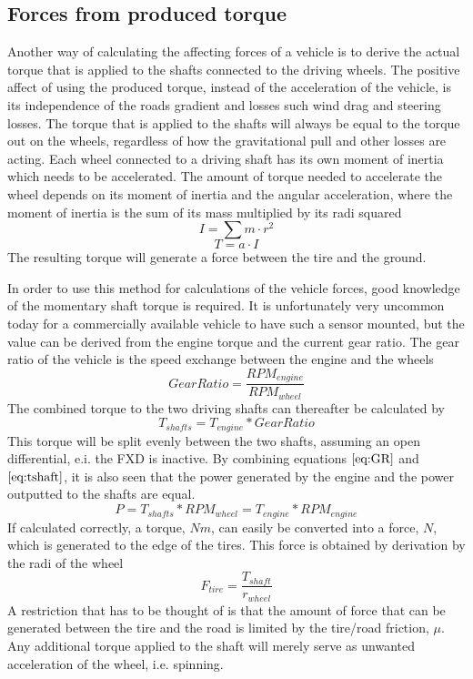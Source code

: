 \subsection{Forces from produced torque}

Another way of calculating the affecting forces of a vehicle is to derive the actual torque that is applied to the shafts connected to the driving wheels. The positive affect of using the produced torque, instead of the acceleration of the vehicle, is its independence of the roads gradient and losses such wind drag and steering losses. The torque that is applied to the shafts will always be equal to the torque out on the wheels, regardless of how the gravitational pull and other losses are acting. Each wheel connected to a driving shaft has its own moment of inertia which needs to be accelerated. The amount of torque needed to accelerate the wheel depends on its moment of inertia and the angular acceleration, where the moment of inertia is the sum of its mass multiplied by its radi squared
\begin{equation}
I = \sum m \cdot r^2
\end{equation}
\begin{equation}
	T = a \cdot I
\end{equation}
The resulting torque will generate a force between the tire and the ground.

In order to use this method for calculations of the vehicle forces, good knowledge of the momentary shaft torque is required. It is unfortunately very uncommon today for a commercially available vehicle to have such a sensor mounted, but the value can be derived from the engine torque and the current gear ratio. The gear ratio of the vehicle is the speed exchange between the engine and the wheels
\begin{equation}
	\label{eq:GR}
	Gear Ratio = \frac{RPM_{engine}}{RPM_{wheel}}
\end{equation}
The combined torque to the two driving shafts can thereafter be calculated by
\begin{equation}
	\label{eq:tshaft}
	T_{shafts} = T_{engine}*Gear Ratio
\end{equation}
This torque will be split evenly between the two shafts, assuming an open differential, e.i. the FXD is inactive. By combining equations $ \ref{eq:GR} $ and $ \ref{eq:tshaft} $, it is also seen that the power generated by the engine and the power outputted to the shafts are equal.
\begin{equation}
	P = T_{shafts}*RPM_{wheel} = T_{engine}*RPM_{engine}
\end{equation}
If calculated correctly, a torque, $ Nm $, can easily be converted into a force, $ N $, which is generated to the edge of the tires. This force is obtained by derivation by the radi of the wheel
\begin{equation}
	F_{tire} = \frac{T_{shaft}}{r_{wheel}}
\end{equation}
A restriction that has to be thought of is that the amount of force that can be generated between the tire and the road is limited by the tire/road friction, $ \mu $. Any additional torque applied to the shaft will merely serve as unwanted acceleration of the wheel, i.e. spinning.


